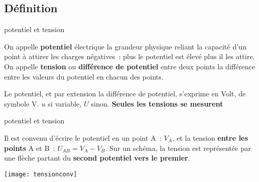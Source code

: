 \documentclass[../main/main.tex]{subfiles}
\begin{document}
\subsection{Définition}
\begin{tcbraster}[raster columns=5, raster equal height=rows]
    \begin{defi}[label=def:tension, sidebyside, raster multicolumn=3]{potentiel et tension}

        On appelle \textbf{potentiel} électrique la grandeur physique reliant la
        capacité d'un point à attirer les charges négatives~: plus le potentiel
        est élevé plus il les attire. On appelle \textbf{tension} ou
        \textbf{différence de potentiel} entre deux points la différence entre
        les valeurs du potentiel en chacun des points.

        \tcblower
        Le potentiel, et par extension la différence de potentiel, s'exprime en
        Volt, de symbole V.
        $u$ si variable, $U$ sinon.
        \textbf{Seules les tensions se mesurent}
    \end{defi}
    \begin{nota}[label=nota:tension, raster multicolumn=2]{potentiel et tension}

        Il est convenu d'écrire le potentiel en un point A~: $V_A$, et la
        tension \textbf{entre les points} A et B~: $U_{AB} = V_A - V_B$. Sur un
        schéma, la tension est représentée par une flèche partant du
        \textbf{second potentiel vers le premier}.

        \tcblower
        \begin{center}
            \texttt{[image: tensionconv]}
        \end{center}
    \end{nota}
\end{tcbraster}
\end{document}
